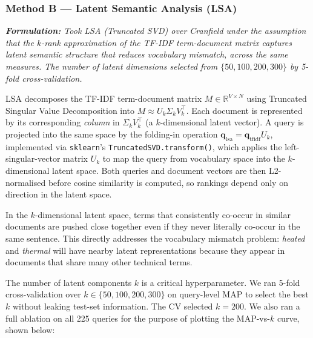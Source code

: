 \documentclass{svproc}
\begin{document}
    \subsubsection{Method B — Latent Semantic Analysis (LSA)}

    \textit{\textbf{Formulation:} Took LSA (Truncated SVD) over Cranfield under the assumption that the $k$-rank approximation of the TF-IDF term-document matrix captures latent semantic structure that reduces vocabulary mismatch, across the same measures. The number of latent dimensions selected from $\{50, 100, 200, 300\}$ by 5-fold cross-validation.}

    LSA decomposes the TF-IDF term-document matrix $M \in \mathbb{R}^{V \times N}$ using Truncated Singular Value Decomposition into $M \approx U_k \Sigma_k V_k^\top$. Each document is represented by its corresponding \emph{column} in $\Sigma_k V_k^\top$ (a $k$-dimensional latent vector). A query is projected into the same space by the folding-in operation $\mathbf{q}_{\mathrm{lsa}} = \mathbf{q}_{\mathrm{tfidf}} U_k$, implemented via \texttt{sklearn}'s \texttt{TruncatedSVD.transform()}, which applies the left-singular-vector matrix $U_k$ to map the query from vocabulary space into the $k$-dimensional latent space. Both queries and document vectors are then L2-normalised before cosine similarity is computed, so rankings depend only on direction in the latent space.

    In the $k$-dimensional latent space, terms that consistently co-occur in similar documents are pushed close together even if they never literally co-occur in the same sentence. This directly addresses the vocabulary mismatch problem: \textit{heated} and \textit{thermal} will have nearby latent representations because they appear in documents that share many other technical terms.

    The number of latent components $k$ is a critical hyperparameter. We ran 5-fold cross-validation over $k \in \{50, 100, 200, 300\}$ on query-level MAP to select the best $k$ without leaking test-set information. The CV selected $k{=}200$. We also ran a full ablation on all 225 queries for the purpose of plotting the MAP-vs-$k$ curve, shown below:
\end{document}
